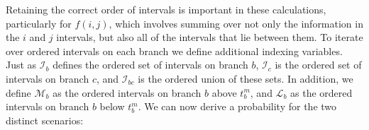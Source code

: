 \documentclass[11pt]{article}
\begin{document}

Retaining the correct order of intervals is important in these calculations, 
particularly for $f(i,j)$, which involves summing over not only the information
in the $i$ and $j$ intervals, but also all of the intervals that lie between 
them. To iterate over ordered intervals on each branch we define additional
indexing variables. Just as $\mathcal{I}_b$ defines the ordered set of intervals 
on branch $b$, $\mathcal{I}_c$ is the ordered set of intervals on branch $c$, and
$\mathcal{I}_{bc}$ is the ordered union of these sets. In addition, we define
$\mathcal{M}_{b}$ as the ordered intervals on branch $b$ above 
$t_b^m$, and $\mathcal{L}_{b}$ as the ordered intervals on branch $b$ 
below $t_b^m$.
We can now derive a probability for the two distinct scenarios:

\end{document}
